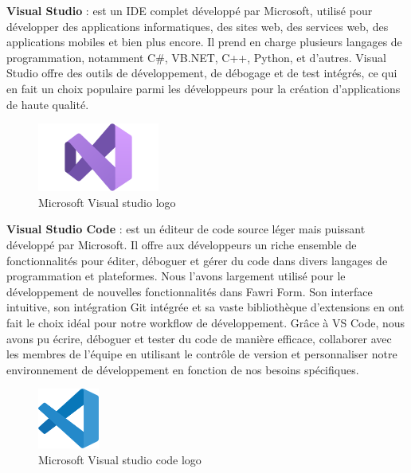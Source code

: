\textbf{Visual Studio} : est un IDE complet développé par Microsoft, utilisé pour développer des applications informatiques, des sites web, des services web, des applications mobiles et bien plus encore. Il prend en charge plusieurs langages de programmation, notamment C\#, VB.NET, C++, Python, et d'autres. Visual Studio offre des outils de développement, de débogage et de test intégrés, ce qui en fait un choix populaire parmi les développeurs pour la création d'applications de haute qualité.
\\
\begin{figure}[H]
    \centering
    \includegraphics[width=4cm]{Figures/Visual-Studio-logo.png}
    \caption{Microsoft Visual studio logo}
\end{figure}




\textbf{Visual Studio Code} : est un éditeur de code source léger mais puissant développé par Microsoft. Il offre aux développeurs un riche ensemble de fonctionnalités pour éditer, déboguer et gérer du code dans divers langages de programmation et plateformes. Nous l'avons largement utilisé pour le développement de nouvelles fonctionnalités dans Fawri Form. Son interface intuitive, son intégration Git intégrée et sa vaste bibliothèque d'extensions en ont fait le choix idéal pour notre workflow de développement. Grâce à VS Code, nous avons pu écrire, déboguer et tester du code de manière efficace, collaborer avec les membres de l'équipe en utilisant le contrôle de version et personnaliser notre environnement de développement en fonction de nos besoins spécifiques.
\\
\begin{figure}[H]
    \centering
    \includegraphics[width=2cm]{Figures/vsclogo.png}
    \caption{Microsoft Visual studio code logo}
\end{figure}




